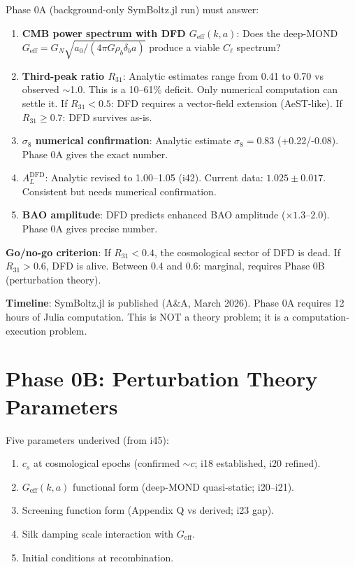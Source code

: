 \documentclass[11pt,a4paper]{article}
\begin{document}
\begin{tcolorbox}[colback=red!5!white, colframe=red!60!black,
  title={CRITICAL: What Phase 0A Must Demonstrate for Theory}]

Phase 0A (background-only SymBoltz.jl run) must answer:

\begin{enumerate}
\item \textbf{CMB power spectrum with DFD $G_{\text{eff}}(k,a)$}: Does the deep-MOND $G_{\text{eff}} = G_N \sqrt{a_0 / (4\pi G \rho_b \delta_b a)}$ produce a viable $C_\ell$ spectrum?

\item \textbf{Third-peak ratio $R_{31}$}: Analytic estimates range from 0.41 to 0.70 vs observed $\sim$1.0. This is a 10--61\% deficit. Only numerical computation can settle it. If $R_{31} < 0.5$: DFD requires a vector-field extension (AeST-like). If $R_{31} \geq 0.7$: DFD survives as-is.

\item \textbf{$\sigma_8$ numerical confirmation}: Analytic estimate $\sigma_8 = 0.83$ (+0.22/-0.08). Phase 0A gives the exact number.

\item \textbf{$A_L^{\text{DFD}}$}: Analytic revised to 1.00--1.05 (i42). Current data: $1.025 \pm 0.017$. Consistent but needs numerical confirmation.

\item \textbf{BAO amplitude}: DFD predicts enhanced BAO amplitude ($\times 1.3$--$2.0$). Phase 0A gives precise number.
\end{enumerate}

\textbf{Go/no-go criterion}: If $R_{31} < 0.4$, the cosmological sector of DFD is dead. If $R_{31} > 0.6$, DFD is alive. Between 0.4 and 0.6: marginal, requires Phase 0B (perturbation theory).

\textbf{Timeline}: SymBoltz.jl is published (A\&A, March 2026). Phase 0A requires 12 hours of Julia computation. This is NOT a theory problem; it is a computation-execution problem.
\end{tcolorbox}

\section{Phase 0B: Perturbation Theory Parameters}

Five parameters underived (from i45):
\begin{enumerate}
\item $c_s$ at cosmological epochs (confirmed $\sim c$; i18 established, i20 refined).
\item $G_{\text{eff}}(k,a)$ functional form (deep-MOND quasi-static; i20--i21).
\item Screening function form (Appendix Q vs derived; i23 gap).
\item Silk damping scale interaction with $G_{\text{eff}}$.
\item Initial conditions at recombination.
\end{enumerate}
\end{document}
